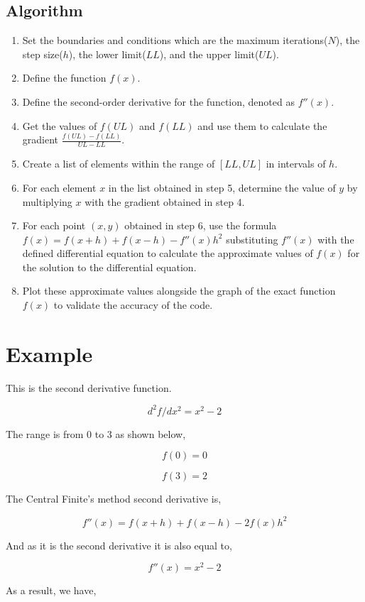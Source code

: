 \documentclass{article}
\begin{document}
\subsection*{Algorithm}
\begin{enumerate}
    \item Set the boundaries and conditions which are the maximum iterations($N$), the step size($h$), the lower limit($LL$), and the upper limit($UL$).
    \item Define the function $f(x)$.
    \item Define the second-order derivative for the function, denoted as $f''(x)$.
    \item Get the values of $f(UL)$ and $f(LL)$ and use them to calculate the gradient $\frac{f(UL)-f(LL)}{UL-LL}$.
    \item Create a list of elements within the range of $[LL, UL]$ in intervals of $h$.
    \item For each element $x$ in the list obtained in step 5, determine the value of $y$ by multiplying $x$ with the gradient obtained in step 4.
    \item For each point $(x,y)$ obtained in step 6, use the formula $f(x)=f(x+h)+f(x-h)-f''(x)h^2$ substituting $f''(x)$ with the defined differential equation to calculate the approximate values of $f(x)$ for the solution to the differential equation.
    \item Plot these approximate values alongside the graph of the exact function $f(x)$ to validate the accuracy of the code.
\end{enumerate}


\section*{Example}

This is the second derivative function.

$$d^2f/dx^2 = x^2 - 2$$

The range is from 0 to 3 as shown below,

$$f(0) = 0$$

$$f(3) = 2$$

The Central Finite's method second derivative is,

$$f''(x) = f(x+h) + f(x-h) - 2f(x)h^2$$

And as it is the second derivative it is also equal to,

$$f''(x) = x^2 - 2$$

As a result, we have,
\end{document}

